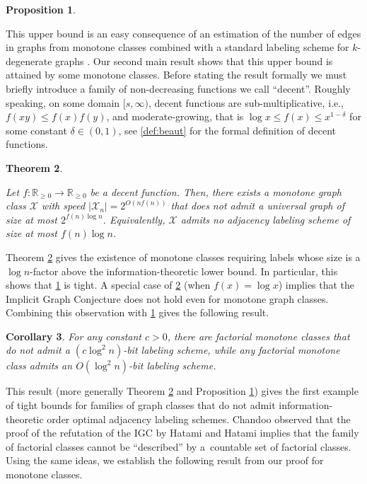 \documentclass[letterpaper,11pt]{article}
\newcommand{\dec}{decent\xspace}
\newcommand{\Rrr}{\mathbb{R}_{\geq 0}}
\newcommand{\Xc}{\mathcal{X}}
\newtheorem{theorem}{Theorem}[section]
\newtheorem{proposition}[theorem]{Proposition}
\newtheorem{corollary}[theorem]{Corollary}
\theoremstyle{definition}
\theoremstyle{remark}
\renewcommand{\leq}{\leqslant}
\renewcommand{\geq}{\geqslant}
\begin{document}
\begin{proposition}\label{lem:monotone-factorial}
	\monofactorial
\end{proposition}

This upper bound is an easy consequence of an estimation of the number of edges in graphs from monotone classes combined with a standard labeling scheme for $k$-degenerate graphs \cite{KNR88}. 
 Our second main result shows that this upper bound is attained by some monotone classes.
 Before stating the result formally we must briefly introduce a family of non-decreasing functions we call ``decent''.  Roughly speaking, on some domain $[s,\infty)$, decent  functions are sub-multiplicative, i.e.,\ $f(xy) \leq f(x)f(y)$, and moderate-growing, that is $\log x \leq f(x) \leq x^{1-\delta}$ for some constant $\delta\in(0,1)$, see \cref{def:beaut} for the formal definition of decent functions.
 
 

 \def\lowerbound{
 	Let $f : \Rrr \rightarrow \Rrr$ be a \dec function. 
 	Then, there exists a monotone graph class $\mathcal{X}$ with speed $|\Xc_n| = 2^{O(nf(n))}$ 
 	that does not admit a universal graph of size at most $2^{f(n) \log n}$. 
 	Equivalently, $\Xc$ admits no adjacency labeling scheme of size at most $ f(n) \log n$.}
 \begin{theorem}\label{th:main}
 	\lowerbound
 \end{theorem}

 

 
 	Theorem \ref{th:main} gives the existence of monotone classes requiring labels whose size is a $\log n$-factor above the information-theoretic lower bound. In particular, this shows that \cref{lem:monotone-factorial} is tight. 
A special case of \cref{th:main} (when $f(x) = \log x$) implies that the Implicit Graph Conjecture does not hold even for monotone graph classes. Combining this observation with \cref{lem:monotone-factorial} gives the following result. 

\begin{corollary}\label{cor:factorial}
	For any constant $c>0$, there are factorial monotone classes that do not admit a $(c \log^2 n)$-bit labeling scheme, while any factorial monotone class admits an $O(\log^2 n)$-bit labeling scheme. 
\end{corollary}

This result (more generally Theorem \ref{th:main} and Proposition \ref{lem:monotone-factorial}) gives the first example of tight bounds for families of graph classes that do not admit information-theoretic order optimal adjacency labeling schemes.
Chandoo \cite{Chandoo23} observed that the proof of the refutation of the IGC by Hatami and Hatami \cite{HH22} implies that the family of factorial classes cannot be ``described'' by a~countable set of factorial classes. Using the same ideas, we establish the following result from our proof for monotone classes.  
\end{document}
